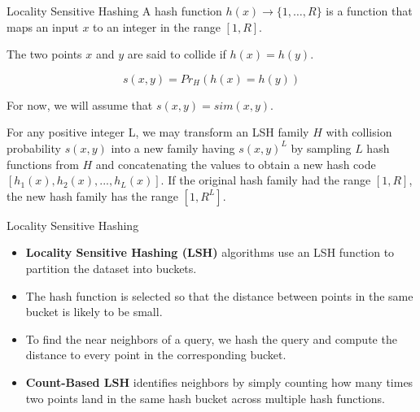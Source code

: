\documentclass[Serif, 10pt, brown]{beamer}
\theoremstyle{example}
\theoremstyle{plain}
\begin{document}
\begin{frame}{Locality Sensitive Hashing}
	A hash function $h(x) \rightarrow \{1, \dots, R\}$ is a function that maps an input $x$ to an integer in the range $[1, R]$. 

	The two points $x$ and $y$ are said to collide if $h(x) = h(y)$.

	\[s(x, y) = Pr_H(h(x) = h(y))\]

	For now, we will assume that $s(x, y) = sim(x, y)$.

	For any positive integer L, we may transform an LSH family $H$ with collision probability $s(x,y)$ into a new family having $s(x,y)^L$ by sampling $L$ hash functions from $H$ and concatenating the values to obtain a new hash code $[h_1(x),h_2(x),...,h_L(x)]$. If the original hash family had the range $[1, R]$, the new hash family has the range $[1, R^L]$.
\end{frame}
\begin{frame}{Locality Sensitive Hashing}
	\begin{itemize}
		\item {\bf Locality Sensitive Hashing (LSH)} algorithms use an LSH function to partition the dataset into buckets.
		\item The hash function is selected so that the distance between points in the same bucket is likely to be small. 
		\item To find the near neighbors of a query, we hash the query and compute the distance to every point in the corresponding bucket.
		\item  {\bf Count-Based LSH} identifies neighbors by simply counting how many times two points land in the same hash bucket across multiple hash functions.
	\end{itemize}
\end{frame}
\end{document}
